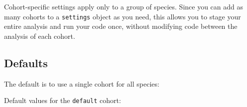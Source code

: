 \documentclass[
]{book}
\newenvironment{Shaded}{\begin{snugshade}}{\end{snugshade}}
\newcommand{\DecValTok}[1]{\textcolor[rgb]{0.00,0.00,0.81}{#1}}
\newcommand{\NormalTok}[1]{#1}
\newcommand{\OperatorTok}[1]{\textcolor[rgb]{0.81,0.36,0.00}{\textbf{#1}}}
\newcommand{\StringTok}[1]{\textcolor[rgb]{0.31,0.60,0.02}{#1}}
\begin{document}
Cohort-specific settings apply only to a group of species. Since you can add as many cohorts to a \texttt{settings} object as you need, this allows you to stage your entire analysis and run your code once, without modifying code between the analysis of each cohort.

\hypertarget{defaults-1}{%
\subsection*{Defaults}\label{defaults-1}}

The default is to use a single cohort for all species:

\begin{Shaded}
\end{Shaded}

Default values for the \texttt{default} cohort:
\end{document}
